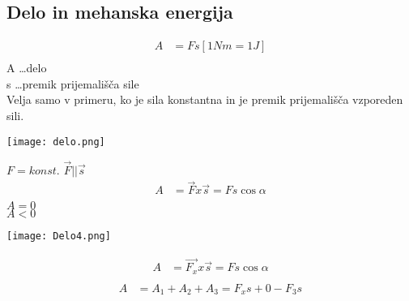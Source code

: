 {\color{indiagreen}\subsection{Delo in mehanska energija}}
\begin{align*}
	A &= Fs [1Nm = 1J]\\
\end{align*}
A \dots delo\\
s \dots premik prijemališča sile\\
Velja samo v primeru, ko je sila konstantna in je premik prijemališča vzporeden sili.\\
\begin{center}
	\texttt{[image: delo.png]}
\end{center}
$F = konst.$ \hspace{1cm} $\vec{F} || \vec{s}$\\
\begin{align*}
	A &= \vec{F} x \vec{s} = Fs\cos\alpha\\
\end{align*}
$A = 0$\\
$A < 0$\\
\begin{center}
	\texttt{[image: Delo4.png]}
\end{center}
\begin{align*}
	A &= \vec{F_x} x \vec{s} = Fs\cos\alpha\\
\end{align*}
\begin{align*}
	A &= A_1 + A_2 + A_3 = F_xs + 0 - F_3s\\
\end{align*}
